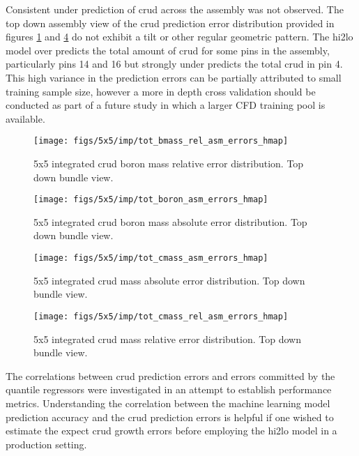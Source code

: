 Consistent under prediction of crud across the assembly was not observed. The top down assembly view of the crud prediction error distribution provided in figures \ref{fig:totbmassrelasmerrorshmap} and \ref{fig:totcmassrelasmerrorshmap} do not exhibit a tilt or other regular geometric pattern.  The hi2lo model over predicts the total amount of crud for some pins in the assembly, particularly pins 14 and 16 but strongly under predicts the total crud in pin 4.  This high variance in the prediction errors can be partially attributed to small training sample size, however a more in depth cross validation should be conducted as part of a future study in which a larger CFD training pool is available.  

\begin{figure}[H]
    \centering
    \texttt{[image: figs/5x5/imp/tot\_bmass\_rel\_asm\_errors\_hmap]}
    \caption{5x5 integrated crud boron mass relative error distribution. Top down bundle view.}
    \label{fig:totbmassrelasmerrorshmap}
\end{figure}
\begin{figure}[H]
    \centering
    \texttt{[image: figs/5x5/imp/tot\_boron\_asm\_errors\_hmap]}
    \caption{5x5 integrated crud boron mass absolute error distribution. Top down bundle view. }
    \label{fig:totboronasmerrorshmap}
\end{figure}
\begin{figure}[H]
    \centering
    \texttt{[image: figs/5x5/imp/tot\_cmass\_asm\_errors\_hmap]}
    \caption{5x5 integrated crud mass absolute error distribution. Top down bundle view.}
    \label{fig:totcmassasmerrorshmap}
\end{figure}
\begin{figure}[H]
    \centering
    \texttt{[image: figs/5x5/imp/tot\_cmass\_rel\_asm\_errors\_hmap]}
    \caption{5x5 integrated crud mass relative error distribution. Top down bundle view.}
    \label{fig:totcmassrelasmerrorshmap}
\end{figure}

The correlations between crud prediction errors and errors committed by the quantile regressors were investigated in an attempt to establish performance metrics.  Understanding the correlation between the machine learning model prediction accuracy and the crud prediction errors is helpful if one wished to estimate the expect crud growth errors before employing the hi2lo model in a production setting.

